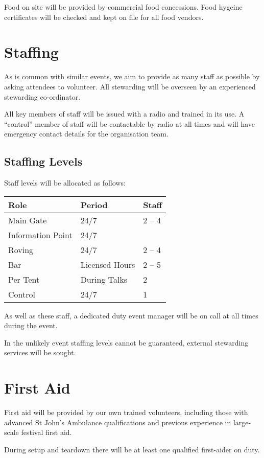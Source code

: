 Food on site will be provided by commercial food concessions. Food hygeine certificates will be checked and kept on file for all food vendors.

\section{Staffing}

As is common with similar events, we aim to provide as many staff as possible
by asking attendees to volunteer. All stewarding will be overseen by an experienced stewarding co-ordinator.

All key members of staff will be issued with a radio and trained in its use. A ``control'' member of staff will be
contactable by radio at all times and will have emergency contact details for the organisation team.

\subsection{Staffing Levels}

Staff levels will be allocated as follows:

\begin{tabular}{l l l}
Role & Period & Staff \\
\hline
Main Gate & 24/7 & 2 -- 4 \\
Information Point & 24/7 & \\
Roving & 24/7 & 2 -- 4 \\
Bar & Licensed Hours & 2 -- 5 \\
Per Tent & During Talks & 2 \\
Control & 24/7 & 1
\end{tabular}

As well as these staff, a dedicated duty event manager will be on call at all times during the event.

In the unlikely event staffing levels cannot be guaranteed, external stewarding services will be sought.

\section{First Aid}

First aid will be provided by our own trained volunteers, including those with advanced St John's Ambulance
qualifications and previous experience in large-scale festival first aid.

During setup and teardown there will be at least one qualified first-aider on duty.

